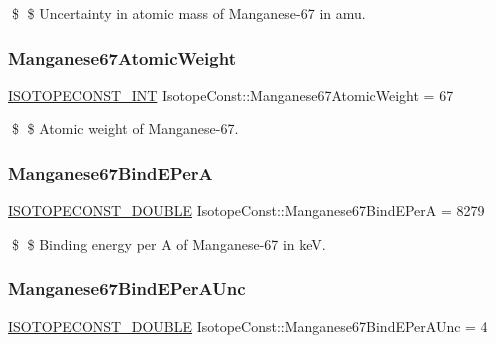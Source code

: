 \$ \$ Uncertainty in atomic mass of Manganese-\/67 in amu. \mbox{\label{group___isotope_const-_manganese-_mn67_ga12650bc4cd8680b6becf8f33ae625587}} 
\subsubsection{\texorpdfstring{Manganese67\+Atomic\+Weight}{Manganese67AtomicWeight}}
{\footnotesize\ttfamily \mbox{\hyperlink{group___isotope_const-_macros_ga5f18360b3e99483a35c32d789e62621c}{I\+S\+O\+T\+O\+P\+E\+C\+O\+N\+S\+T\+\_\+\+I\+NT}} Isotope\+Const\+::\+Manganese67\+Atomic\+Weight = 67}

\$ \$ Atomic weight of Manganese-\/67. \mbox{\label{group___isotope_const-_manganese-_mn67_ga7cdc329a88ec824ff164b93b5e2186f9}} 
\subsubsection{\texorpdfstring{Manganese67\+Bind\+E\+PerA}{Manganese67BindEPerA}}
{\footnotesize\ttfamily \mbox{\hyperlink{group___isotope_const-_macros_ga8f45a7272ce02c0b4c65c44636ed719a}{I\+S\+O\+T\+O\+P\+E\+C\+O\+N\+S\+T\+\_\+\+D\+O\+U\+B\+LE}} Isotope\+Const\+::\+Manganese67\+Bind\+E\+PerA = 8279}

\$ \$ Binding energy per A of Manganese-\/67 in keV. \mbox{\label{group___isotope_const-_manganese-_mn67_ga56cd1371b2aaf8a99fabf4538ca1f9f5}} 
\subsubsection{\texorpdfstring{Manganese67\+Bind\+E\+Per\+A\+Unc}{Manganese67BindEPerAUnc}}
{\footnotesize\ttfamily \mbox{\hyperlink{group___isotope_const-_macros_ga8f45a7272ce02c0b4c65c44636ed719a}{I\+S\+O\+T\+O\+P\+E\+C\+O\+N\+S\+T\+\_\+\+D\+O\+U\+B\+LE}} Isotope\+Const\+::\+Manganese67\+Bind\+E\+Per\+A\+Unc = 4}

